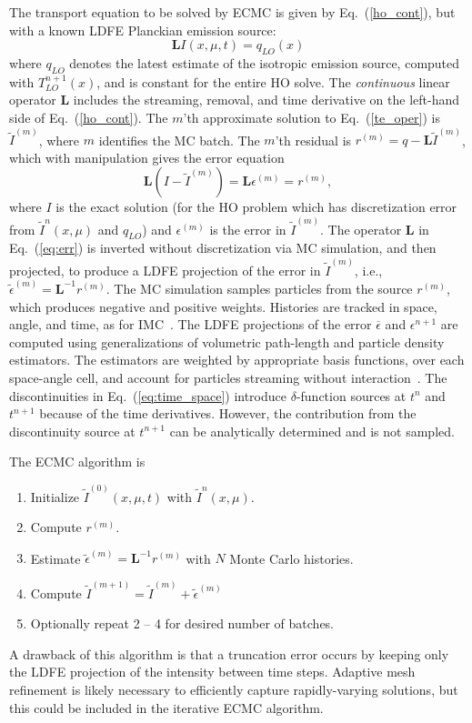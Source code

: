 \documentclass{anstrans}
\renewcommand{\eqref}[1]{(\ref{#1})}
\newcommand{\B}[1]{\ensuremath{\mathbf{#1}}}
\begin{document}
The transport equation to be solved by ECMC is given by Eq.~\eqref{ho_cont}, but with a
known LDFE Planckian emission source:
\begin{equation}\label{te_oper}
    \B L I(x,\mu,t)  = q_{LO}(x)
\end{equation}
where $q_{LO}$ denotes the latest estimate of the isotropic emission source, computed with
$T_{LO}^{n+1}(x)$, and is constant for the entire HO solve.  The \emph{continuous} linear operator $\B L$ includes the streaming, removal, and
time derivative on the left-hand side of Eq.~\eqref{ho_cont}.  
The $m$'th approximate solution to Eq.~\eqref{te_oper} is $\tilde{I}^{(m)}$, where
$m$ identifies the MC batch.
The $m$'th residual is $r^{(m)} = q - \B L\tilde{I}^{(m)}$, which with manipulation gives the error equation
\begin{equation}\label{eq:err}
\B L (I - \tilde{I}^{(m)}) = \B L {\epsilon}^{(m)} = r^{(m)},
\end{equation}
where $I$ is the exact solution (for the HO problem which has discretization error from
$\tilde I^{n}(x,\mu)$ and $q_{LO}$) and ${\epsilon}^{(m)}$ is the error in
$\tilde{I}^{(m)}$. The operator $\B L$ in Eq.~\eqref{eq:err} is inverted without discretization via MC simulation, and then
projected, to produce a LDFE projection of the error in $\tilde{I}^{(m)}$, i.e., $\tilde{\epsilon}^{(m)} = \B
L^{-1} r^{(m)}$.  The MC simulation samples particles from the source $r^{(m)}$, which
produces negative and positive weights.  Histories are tracked in space, angle, and time, as for IMC~\cite{fnc}.
The LDFE projections of the error $\overline{\epsilon}$ and $\epsilon^{n+1}$ are computed using
generalizations of volumetric path-length and particle density
estimators.  The estimators are weighted by appropriate basis
functions, over each
space-angle cell, and account for particles streaming without interaction~\cite{bolding_nse}.
The discontinuities in Eq.~\eqref{eq:time_space} introduce $\delta$-function sources at $t^{n}$ and $t^{n+1}$
because of the time derivatives.
However, the contribution from the discontinuity source at $t^{n+1}$ can be analytically
determined and is not sampled.

  The ECMC algorithm is
\begin{enumerate}
    \item Initialize $\tilde I^{(0)}(x,\mu,t)$ with $\tilde I^{n}(x,\mu)$.
\item Compute $r^{(m)}$.
\item Estimate $\tilde{\epsilon}^{(m)} = \B L^{-1} r^{(m)}$ with $N$ Monte Carlo histories.
\item Compute $\tilde I^{(m+1)} = \tilde I^{(m)}
+ \tilde\epsilon^{(m)}$
\item Optionally repeat 2 -- 4 for desired number of batches.
\end{enumerate}
A drawback of this algorithm is that
a truncation error occurs by keeping only the LDFE projection of the intensity between
time steps.  Adaptive mesh refinement is likely necessary to efficiently capture rapidly-varying solutions, but
this could be included in the iterative ECMC algorithm.
\end{document}
